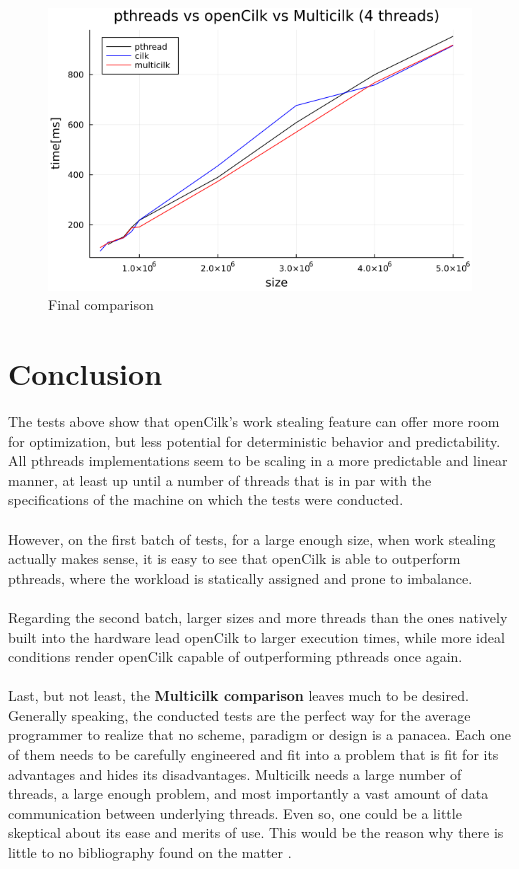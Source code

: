 \documentclass[11pt,a4paper,onecolumn,final]{article}
\newcommand{\en}[1]{\foreignlanguage{english}{#1}}
\begin{document}
\begin{figure}[p]
    \centering
    \includegraphics[scale=.5]{../data/image/benchmark/4-threads.png}
    \caption{Final comparison}
\end{figure}

\section{Conclusion}
The tests above show that openCilk's work stealing feature can offer more room for optimization, but less potential for deterministic behavior and predictability. All pthreads implementations seem to be scaling in a more predictable and linear manner, at least up until a number of threads that is in par with the specifications of the machine on which the tests were conducted.\\
\\
However, on the first batch of tests, for a large enough size, when work stealing actually makes sense, it is easy to see that openCilk is able to outperform pthreads, where the workload is statically assigned and prone to imbalance.\\
\\
Regarding the second batch, larger sizes and more threads than the ones natively built into the hardware lead openCilk to larger execution times, while more ideal conditions render openCilk capable of outperforming pthreads once again.\\
\\
Last, but not least, the \textbf{Multicilk comparison} leaves much to be desired. Generally speaking, the conducted tests are the perfect way for the average programmer to realize that no scheme, paradigm or design is a panacea. Each one of them needs to be carefully engineered and fit into a problem that is fit for its advantages and hides its disadvantages. Multicilk needs a large number of threads, a large enough problem, and most importantly a vast amount of data communication between underlying threads. Even so, one could be a little skeptical about its ease and merits of use. This would be the reason why there is little to no bibliography found on the matter \cite{pusapaty2022combining}.



\en{}
\end{document}
